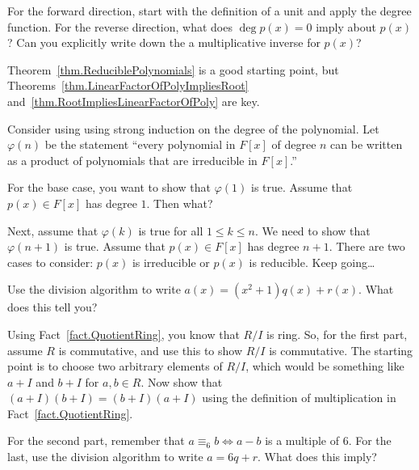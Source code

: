 \begin{hint*}
For the forward direction, start with the definition of a unit and apply the degree function. For the reverse direction, what does $\deg p(x) = 0$ imply about $p(x)$? Can you explicitly write down the a multiplicative inverse for $p(x)$?
\end{hint*}

\begin{hint*}
Theorem~\ref{thm.ReduciblePolynomials} is a good starting point, but Theorems~\ref{thm.LinearFactorOfPolyImpliesRoot} and~\ref{thm.RootImpliesLinearFactorOfPoly} are key.
\end{hint*}

\begin{hint*}
Consider using using strong induction on the degree of the polynomial. Let $\varphi(n)$ be the statement ``every polynomial in $F[x]$ of degree $n$ can be written as a product of polynomials that are irreducible in $F[x]$.'' 

For the base case, you want to show that $\varphi(1)$ is true. Assume that $p(x)\in F[x]$ has degree $1$. Then what? 

Next, assume that $\varphi(k)$ is true for all $1\le k \le n$. We need to show that $\varphi(n+1)$ is true. Assume that $p(x)\in F[x]$ has degree $n+1$. There are two cases to consider: $p(x)$ is irreducible or $p(x)$ is reducible. Keep going\ldots
\end{hint*}

\begin{hint*}
Use the division algorithm to write $a(x) = (x^2+1)q(x) + r(x)$. What does this tell you?
\end{hint*}


\begin{hint*}
Using Fact~\ref{fact.QuotientRing}, you know that $R/I$ is ring. So, for the first part, assume $R$ is commutative, and use this to show $R/I$ is commutative. The starting point is to choose two arbitrary elements of $R/I$, which would be something like $a+I$ and $b+I$ for $a,b\in R$. Now show that $(a+I)(b+I) = (b+I)(a+I)$ using the definition of multiplication in Fact~\ref{fact.QuotientRing}. 
\end{hint*}

\begin{hint*}
For the second part, remember that $a\equiv_6 b \iff a-b$ is a multiple of $6$. For the last, use the division algorithm to write $a = 6q + r$. What does this imply? 
\end{hint*}

